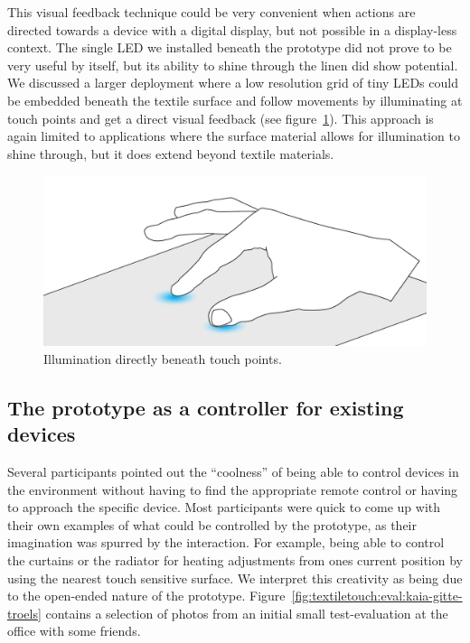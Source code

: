 This visual feedback technique could be very convenient when actions are directed towards a device with a digital display, but not possible in a display-less context.
The single LED we installed beneath the prototype did not prove to be very useful by itself, but its ability to shine through the linen did show potential.
We discussed a larger deployment where a low resolution grid of tiny LEDs could be embedded beneath the textile surface and follow movements by illuminating at touch points and get a direct visual feedback (see figure~\ref{fig:textiletouch:eval:backlighting}).
This approach is again limited to applications where the surface material allows for illumination to shine through, but it does extend beyond textile materials.

\begin{figure}[h]
  \centering
  \begin{minipage}[b]{.8\textwidth}
    \centering
    \includegraphics[width=.7\linewidth]{figures/touch/evaluation/backlid_textile}
  \caption[Illumination directly beneath touch points.]
  {Illumination directly beneath touch points.}
  \label{fig:textiletouch:eval:backlighting}
  \end{minipage}
\end{figure}

\subsection{The prototype as a controller for existing devices}

Several participants pointed out the ``coolness'' of being able to control devices in the environment without having to find the appropriate remote control or having to approach the specific device.
Most participants were quick to come up with their own examples of what could be controlled by the prototype, as their imagination was spurred by the interaction.
For example, being able to control the curtains or the radiator for heating adjustments from ones current position by using the nearest touch sensitive surface.
We interpret this creativity as being due to the open-ended nature of the prototype.
Figure~\ref{fig:textiletouch:eval:kaia-gitte-troels} contains a selection of photos from an initial small test-evaluation at the office with some friends.

